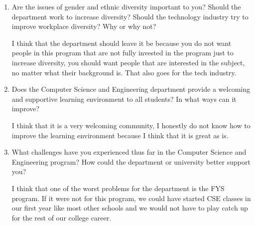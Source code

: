 \documentclass[letterpaper]{article}
\begin{document}
\begin{enumerate}

\item{}Are the issues of gender and ethnic diversity important to you? Should
    the department work to increase diversity? Should the technology industry
    	try to improve workplace diversity? Why or why not?

I think that the department should leave it be because you do not want people in 
this program that are not fully invested in the program just to increase diversity, 
you should want people that are interested in the subject, no matter what their 
background is.  That also goes for the tech industry.

\item{}Does the Computer Science and Engineering department provide a welcoming
    and supportive learning environment to all students? In what ways can it
    	improve?

I think that it is a very welcoming community, I honestly do not know how to improve 
the learning environment because I think that it is great as is.

\item{}What challenges have you experienced thus far in the Computer Science
    and Engineering program? How could the department or university better
    	support you?

I think that one of the worst problems for the department is the FYS program.  If it 
were not for this program, we could have started CSE classes in our first year like 
most other schools and we would not have to play catch up for the rest of our college 
career.

\end{enumerate}
\end{document}
